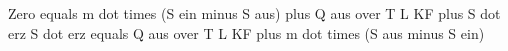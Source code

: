 Zero equals m dot times (S ein minus S aus) plus Q aus over T L KF plus S dot erz  
S dot erz equals Q aus over T L KF plus m dot times (S aus minus S ein)